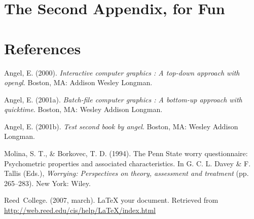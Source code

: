 \documentclass[12pt,twoside]{dukestatscithesis}
\theoremstyle{definition}
\theoremstyle{definition}
\theoremstyle{definition}
\theoremstyle{remark}
\begin{document}
\chapter{The Second Appendix, for
Fun}\label{the-second-appendix-for-fun}

\backmatter

\chapter*{References}\label{references}


\noindent

\setlength{\parindent}{-0.20in} \setlength{\leftskip}{0.20in}
\setlength{\parskip}{8pt}

\hypertarget{refs}{}
\hypertarget{ref-angel2000}{}
Angel, E. (2000). \emph{Interactive computer graphics : A top-down
approach with opengl}. Boston, MA: Addison Wesley Longman.

\hypertarget{ref-angel2001}{}
Angel, E. (2001a). \emph{Batch-file computer graphics : A bottom-up
approach with quicktime}. Boston, MA: Wesley Addison Longman.

\hypertarget{ref-angel2002a}{}
Angel, E. (2001b). \emph{Test second book by angel}. Boston, MA: Wesley
Addison Longman.

\hypertarget{ref-Molina1994}{}
Molina, S. T., \& Borkovec, T. D. (1994). The Penn State worry
questionnaire: Psychometric properties and associated characteristics.
In G. C. L. Davey \& F. Tallis (Eds.), \emph{Worrying: Perspectives on
theory, assessment and treatment} (pp. 265--283). New York: Wiley.

\hypertarget{ref-reedweb2007}{}
Reed~College. (2007, march). LaTeX your document. Retrieved from
\url{http://web.reed.edu/cis/help/LaTeX/index.html}


\end{document}
